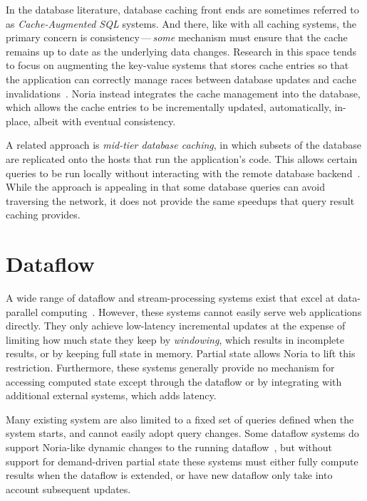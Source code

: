 In the database literature, database caching front ends are sometimes referred
to as \textit{Cache-Augmented SQL} systems. And there, like with all caching
systems, the primary concern is consistency\,---\,\emph{some} mechanism must
ensure that the cache remains up to date as the underlying data changes.
Research in this space tends to focus on augmenting the key-value systems that
stores cache entries so that the application can correctly manage races between
database updates and cache invalidations~\cite{facebook-memcache,
casql-consistency, casql-consistency-thesis}. Noria instead integrates the cache
management into the database, which allows the cache entries to be incrementally
updated, automatically, in-place, albeit with eventual consistency.

A related approach is \textit{mid-tier database caching}, in which subsets of
the database are replicated onto the hosts that run the application's code. This
allows certain queries to be run locally without interacting with the remote
database backend~\cite{mtcache}. While the approach is appealing in that some
database queries can avoid traversing the network, it does not provide the same
speedups that query result caching provides.

\section{Dataflow}

A wide range of dataflow and stream-processing systems exist that excel at
data-parallel computing~\cite{dryad, naiad, storm, heron, flink, millwheel,
spark-streaming, stanford-stream, s-store, cloud-dataflow}. However, these
systems cannot easily serve web applications directly. They only achieve
low-latency incremental updates at the expense of limiting how much state they
keep by \textit{windowing}, which results in incomplete results, or by keeping
full state in memory. Partial state allows Noria to lift this restriction.
Furthermore, these systems generally provide no mechanism for accessing computed
state except through the dataflow or by integrating with additional external
systems, which adds latency.

Many existing system are also limited to a fixed set of queries defined when the
system starts, and cannot easily adopt query changes. Some dataflow systems do
support Noria-like dynamic changes to the running dataflow~\cite{ciel, ray}, but
without support for demand-driven partial state these systems must either fully
compute results when the dataflow is extended, or have new dataflow only take
into account subsequent updates.

